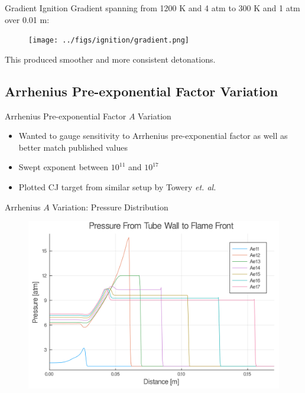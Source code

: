 \begin{frame}{Gradient Ignition}
Gradient spanning from 1200 K and 4 atm to 300 K and 1 atm over 0.01 m:
\begin{figure}[]
\centering
\texttt{[image: ../figs/ignition/gradient.png]}
\end{figure}%
This produced smoother and more consistent detonations. 
\end{frame}


\subsection{Arrhenius Pre-exponential Factor Variation}

\begin{frame}{Arrhenius Pre-exponential Factor $A$ Variation}
\begin{itemize}
\item Wanted to gauge sensitivity to Arrhenius pre-exponential factor as well as better match published values 
\item Swept exponent between $10^{11}$ and $10^{17}$ 
\item Plotted CJ target from similar setup by Towery \textit{et. al.} \cite{towery1}
\end{itemize}
\end{frame}

\begin{frame}{Arrhenius $A$ Variation: Pressure Distribution}
\begin{figure}
\centering
\includegraphics[width=0.8\linewidth]{../figs/Atest/p.png}
\end{figure}
\end{frame}

